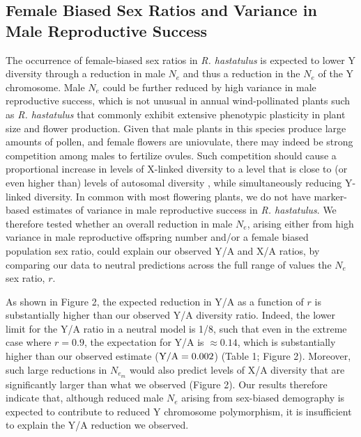 \documentclass[9pt,twocolumn,twoside]{gsajnl}
\begin{document}
\subsection*{Female Biased Sex Ratios and Variance in Male Reproductive Success}
The occurrence of female-biased sex ratios in \textit{R. hastatulus} is expected to lower Y diversity through a reduction in male $N_{e}$ and thus a reduction in the $N_{e}$ of the Y chromosome. Male $N_{e}$ could be further reduced by high variance in male reproductive success, which is not unusual in annual wind-pollinated plants such as \textit{R. hastatulus} that commonly exhibit extensive phenotypic plasticity in plant size and flower production. Given that male plants in this species produce large amounts of pollen, and female flowers are uniovulate, there may indeed be strong competition among males to fertilize ovules. Such competition should cause a proportional increase in levels of X-linked diversity to a level that is close to (or even higher than) levels of autosomal diversity \citep{caballero1995}, while simultaneously reducing Y-linked diversity. In common with most flowering plants, we do not have marker-based estimates of variance in male reproductive success in \textit{R. hastatulus}. We therefore tested whether an overall reduction in male $N_{e}$, arising either from high variance in male reproductive offspring number and/or a female biased population sex ratio, could explain our observed Y/A and X/A ratios, by comparing our data to neutral predictions across the full range of values the $N_{e}$ sex ratio, $r$.

As shown in Figure 2, the expected reduction in Y/A as a function of $r$ is substantially higher than our observed Y/A diversity ratio. Indeed, the lower limit for the Y/A ratio in a neutral model is 1/8, such that even in the extreme case where $r=0.9$, the expectation for Y/A is $\approx 0.14$, which is substantially higher than our observed estimate ($\textnormal{Y/A}=0.002$) (Table 1; Figure 2). Moreover, such large reductions in $N_{e}_{m}$ would also predict levels of X/A diversity that are significantly larger than what we observed (Figure 2). Our results therefore indicate that, although reduced male $N_{e}$ arising from sex-biased demography is expected to contribute to reduced Y chromosome polymorphism, it is insufficient to explain the Y/A reduction we observed.
\end{document}
